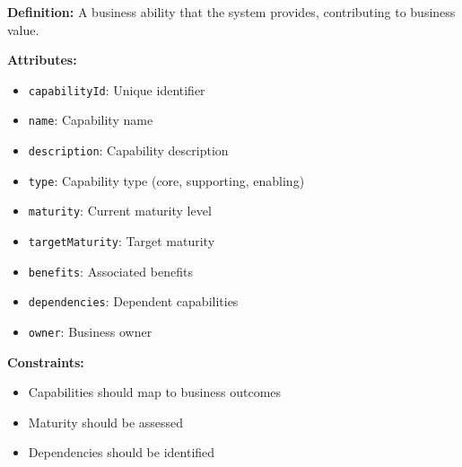 \documentclass[11pt,letterpaper]{article}
\begin{document}
\begin{definitionbox}
\textbf{Definition:} A business ability that the system provides, contributing to business value.

\textbf{Attributes:}
\begin{itemize}[nosep]
    \item \texttt{capabilityId}: Unique identifier
    \item \texttt{name}: Capability name
    \item \texttt{description}: Capability description
    \item \texttt{type}: Capability type (core, supporting, enabling)
    \item \texttt{maturity}: Current maturity level
    \item \texttt{targetMaturity}: Target maturity
    \item \texttt{benefits}: Associated benefits
    \item \texttt{dependencies}: Dependent capabilities
    \item \texttt{owner}: Business owner
\end{itemize}

\textbf{Constraints:}
\begin{itemize}[nosep]
    \item Capabilities should map to business outcomes
    \item Maturity should be assessed
    \item Dependencies should be identified
\end{itemize}
\end{definitionbox}
\end{document}
